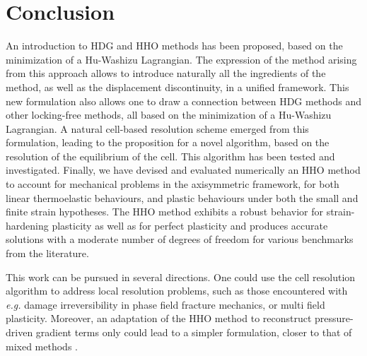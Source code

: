 
\section{Conclusion}


An introduction to HDG and HHO methods has been proposed, based on the minimization of a Hu-Washizu Lagrangian. The expression of the method arising from this approach allows to introduce naturally all the ingredients of the method, as well as the displacement discontinuity, in a unified framework.
This new formulation also allows one to draw a connection between HDG methods and other locking-free methods, all based on the minimization of a Hu-Washizu Lagrangian.
A natural cell-based resolution scheme emerged from this formulation, leading to the proposition for a novel algorithm, based on the resolution of the equilibrium of the cell. This algorithm has been tested and investigated.
Finally, we have devised and evaluated numerically an HHO method to account for mechanical problems in the axisymmetric framework, for both linear thermoelastic behaviours, and plastic behaviours under both the small and finite strain hypotheses.
The HHO method exhibits a robust behavior for strain-hardening plasticity as well as for perfect plasticity and produces accurate solutions with a moderate number of degrees of freedom for various benchmarks from the literature.

This work can be pursued in several directions. One could use the cell resolution algorithm to address local resolution problems, such as those encountered with \textit{e.g.} damage irreversibility in phase field fracture mechanics, or multi field plasticity. Moreover, an adaptation of the HHO method to
reconstruct pressure-driven gradient terms only could lead to a simpler formulation, closer to that of mixed methods \cite{simo_quasi-incompressible_1991}.
